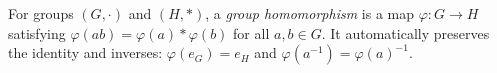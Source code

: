 
For groups $(G,\cdot)$ and $(H,\ast)$, a \emph{group homomorphism} is a map $\varphi:G\to H$ satisfying $\varphi(ab)=\varphi(a)\ast\varphi(b)$ for all $a,b\in G$. It automatically preserves the identity and inverses: $\varphi(e_G)=e_H$ and $\varphi(a^{-1})=\varphi(a)^{-1}$.
